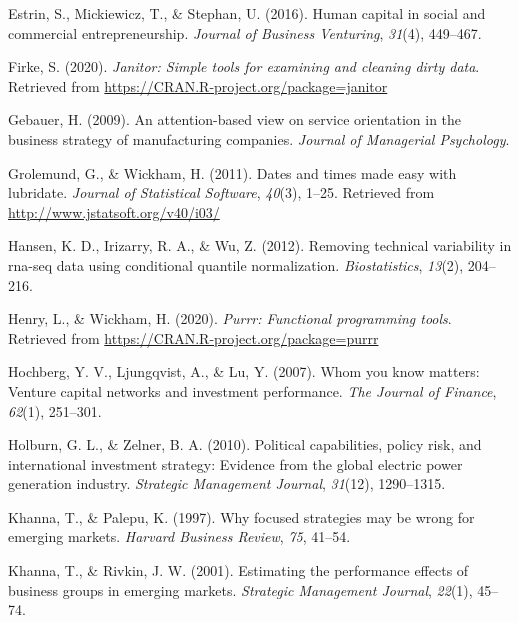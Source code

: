 \documentclass[
  english,
  man]{apa6}
\begin{document}
\leavevmode\hypertarget{ref-estrin2016human}{}%
Estrin, S., Mickiewicz, T., \& Stephan, U. (2016). Human capital in social and commercial entrepreneurship. \emph{Journal of Business Venturing}, \emph{31}(4), 449--467.

\leavevmode\hypertarget{ref-R-janitor}{}%
Firke, S. (2020). \emph{Janitor: Simple tools for examining and cleaning dirty data}. Retrieved from \url{https://CRAN.R-project.org/package=janitor}

\leavevmode\hypertarget{ref-gebauer2009attention}{}%
Gebauer, H. (2009). An attention-based view on service orientation in the business strategy of manufacturing companies. \emph{Journal of Managerial Psychology}.

\leavevmode\hypertarget{ref-R-lubridate}{}%
Grolemund, G., \& Wickham, H. (2011). Dates and times made easy with lubridate. \emph{Journal of Statistical Software}, \emph{40}(3), 1--25. Retrieved from \url{http://www.jstatsoft.org/v40/i03/}

\leavevmode\hypertarget{ref-hansen2012removing}{}%
Hansen, K. D., Irizarry, R. A., \& Wu, Z. (2012). Removing technical variability in rna-seq data using conditional quantile normalization. \emph{Biostatistics}, \emph{13}(2), 204--216.

\leavevmode\hypertarget{ref-R-purrr}{}%
Henry, L., \& Wickham, H. (2020). \emph{Purrr: Functional programming tools}. Retrieved from \url{https://CRAN.R-project.org/package=purrr}

\leavevmode\hypertarget{ref-hochberg2007whom}{}%
Hochberg, Y. V., Ljungqvist, A., \& Lu, Y. (2007). Whom you know matters: Venture capital networks and investment performance. \emph{The Journal of Finance}, \emph{62}(1), 251--301.

\leavevmode\hypertarget{ref-holburn2010political}{}%
Holburn, G. L., \& Zelner, B. A. (2010). Political capabilities, policy risk, and international investment strategy: Evidence from the global electric power generation industry. \emph{Strategic Management Journal}, \emph{31}(12), 1290--1315.

\leavevmode\hypertarget{ref-khanna1997focused}{}%
Khanna, T., \& Palepu, K. (1997). Why focused strategies may be wrong for emerging markets. \emph{Harvard Business Review}, \emph{75}, 41--54.

\leavevmode\hypertarget{ref-khanna2001estimating}{}%
Khanna, T., \& Rivkin, J. W. (2001). Estimating the performance effects of business groups in emerging markets. \emph{Strategic Management Journal}, \emph{22}(1), 45--74.
\end{document}
